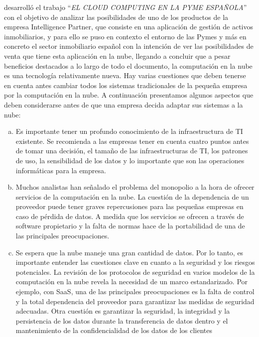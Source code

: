 \cite{diaz} desarrolló el trabajo ``\emph{EL CLOUD COMPUTING EN LA PYME ESPAÑOLA}''
con el objetivo de analizar las posibilidades de uno de los productos de la empresa
Intelligence Partner, que consiste en una aplicación de gestión de activos inmobiliarios, y
para ello se puso en contexto el entorno de las Pymes y más en concreto el
sector inmobiliario español con la intención de ver las posibilidades de venta
que tiene esta aplicación en la nube, llegando a concluir que a pesar beneficios
destacados a lo largo de todo el documento, la computación en la nube es una tecnología
relativamente nueva. Hay varias cuestiones que deben tenerse en cuenta antes cambiar
todos los sistemas tradicionales de la pequeña empresa por la computación en la nube.
A continuación presentamos algunos aspectos que deben considerarse antes de que una
empresa decida adaptar sus sistemas a la nube:
\begin{enumerate}[a.]
    \item   Es importante tener un profundo conocimiento de la infraestructura de TI
            existente. Se recomienda a las empresas tener en cuenta cuatro puntos
            antes de tomar una decisión, el tamaño de las infraestructuras de TI, los
            patrones de uso, la sensibilidad de los datos y lo importante que son las
            operaciones informáticas para la empresa.
    \item   Muchos analistas han señalado el problema del monopolio a la hora de
            ofrecer servicios de la computación en la nube. La cuestión de la dependencia de
            un proveedor puede tener graves repercusiones para las pequeñas
            empresas en caso de pérdida de datos. A medida que los servicios se
            ofrecen a través de software propietario y la falta de normas hace de la
            portabilidad de una de las principales preocupaciones.
    \item   Se espera que la nube maneje una gran cantidad de datos. Por lo tanto,
            es importante entender las cuestiones clave en cuanto a la seguridad y
            los riesgos potenciales. La revisión de los protocolos de seguridad en
            varios modelos de la computación en la nube revela la necesidad de un marco estandarizado.
            Por ejemplo, con SaaS, una de las principales preocupaciones es la falta
            de control y la total dependencia del proveedor para garantizar las
            medidas de seguridad adecuadas. Otra cuestión es garantizar la
            seguridad, la integridad y la persistencia de los datos durante la
            transferencia de datos dentro y el mantenimiento de la confidencialidad
            de los datos de los clientes
\end{enumerate}

